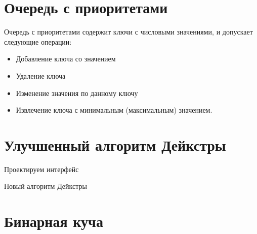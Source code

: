\documentclass[24pt,pdf,hyperref={unicode},aspectratio=169]{beamer}
\begin{document}
\section{Очередь с приоритетами}

\begin{frame}
Очередь с приоритетами содержит ключи с числовыми значениями, и допускает следующие операции: 
\begin{itemize}
\item Добавление ключа со значением
\item Удаление ключа 
\item Изменение значения по данному ключу
\item Извлечение ключа с минимальным (максимальным) значением.
\end{itemize}
\end{frame}

\section{Улучшенный алгоритм Дейкстры}

\begin{frame}
Проектируем интерфейс
\end{frame}

\begin{frame}
Новый алгоритм Дейкстры
\end{frame}

\section{Бинарная куча}
\end{document}
